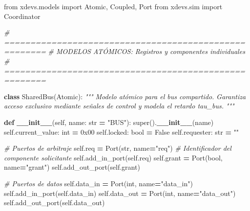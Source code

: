 \documentclass[12pt,oneside]{templates/unerthesis}
\newenvironment{Shaded}{\begin{snugshade}}{\end{snugshade}}
\newcommand{\BaseNTok}[1]{\textcolor[rgb]{0.00,0.00,0.81}{#1}}
\newcommand{\BuiltInTok}[1]{#1}
\newcommand{\CommentTok}[1]{\textcolor[rgb]{0.56,0.35,0.01}{\textit{#1}}}
\newcommand{\FunctionTok}[1]{\textcolor[rgb]{0.13,0.29,0.53}{\textbf{#1}}}
\newcommand{\ImportTok}[1]{#1}
\newcommand{\KeywordTok}[1]{\textcolor[rgb]{0.13,0.29,0.53}{\textbf{#1}}}
\newcommand{\NormalTok}[1]{#1}
\newcommand{\OperatorTok}[1]{\textcolor[rgb]{0.81,0.36,0.00}{\textbf{#1}}}
\newcommand{\StringTok}[1]{\textcolor[rgb]{0.31,0.60,0.02}{#1}}
\newcommand{\VariableTok}[1]{\textcolor[rgb]{0.00,0.00,0.00}{#1}}
\begin{document}
\begin{Shaded}
\begin{Highlighting}[]
\ImportTok{from}\NormalTok{ xdevs.models }\ImportTok{import}\NormalTok{ Atomic, Coupled, Port}
\ImportTok{from}\NormalTok{ xdevs.sim }\ImportTok{import}\NormalTok{ Coordinator}


\CommentTok{\# ======================================================}
\CommentTok{\# MODELOS ATÓMICOS: Registros y componentes individuales}
\CommentTok{\# ======================================================}

\KeywordTok{class}\NormalTok{ SharedBus(Atomic):}
    \CommentTok{"""}
\CommentTok{    Modelo atómico para el bus compartido.}
\CommentTok{    Garantiza acceso exclusivo mediante señales de control y }
\CommentTok{    modela el retardo tau\_bus.}
\CommentTok{    """}
    
    \KeywordTok{def} \FunctionTok{\_\_init\_\_}\NormalTok{(}\VariableTok{self}\NormalTok{, name: }\BuiltInTok{str} \OperatorTok{=} \StringTok{"BUS"}\NormalTok{):}
        \BuiltInTok{super}\NormalTok{().}\FunctionTok{\_\_init\_\_}\NormalTok{(name)}
        \VariableTok{self}\NormalTok{.current\_value: }\BuiltInTok{int} \OperatorTok{=} \BaseNTok{0x00}
        \VariableTok{self}\NormalTok{.locked: }\BuiltInTok{bool} \OperatorTok{=} \VariableTok{False}
        \VariableTok{self}\NormalTok{.requester: }\BuiltInTok{str} \OperatorTok{=} \StringTok{""}
        
        \CommentTok{\# Puertos de arbitraje}
        \VariableTok{self}\NormalTok{.req }\OperatorTok{=}\NormalTok{ Port(}\BuiltInTok{str}\NormalTok{, name}\OperatorTok{=}\StringTok{"req"}\NormalTok{) }
        \CommentTok{\# Identificador del componente solicitante}
        \VariableTok{self}\NormalTok{.add\_in\_port(}\VariableTok{self}\NormalTok{.req)}
        \VariableTok{self}\NormalTok{.grant }\OperatorTok{=}\NormalTok{ Port(}\BuiltInTok{bool}\NormalTok{, name}\OperatorTok{=}\StringTok{"grant"}\NormalTok{)}
        \VariableTok{self}\NormalTok{.add\_out\_port(}\VariableTok{self}\NormalTok{.grant)}
        
        \CommentTok{\# Puertos de datos}
        \VariableTok{self}\NormalTok{.data\_in }\OperatorTok{=}\NormalTok{ Port(}\BuiltInTok{int}\NormalTok{, name}\OperatorTok{=}\StringTok{"data\_in"}\NormalTok{)}
        \VariableTok{self}\NormalTok{.add\_in\_port(}\VariableTok{self}\NormalTok{.data\_in)}
        \VariableTok{self}\NormalTok{.data\_out }\OperatorTok{=}\NormalTok{ Port(}\BuiltInTok{int}\NormalTok{, name}\OperatorTok{=}\StringTok{"data\_out"}\NormalTok{)}
        \VariableTok{self}\NormalTok{.add\_out\_port(}\VariableTok{self}\NormalTok{.data\_out)}
        

\end{Highlighting}
\end{Shaded}
\end{document}
